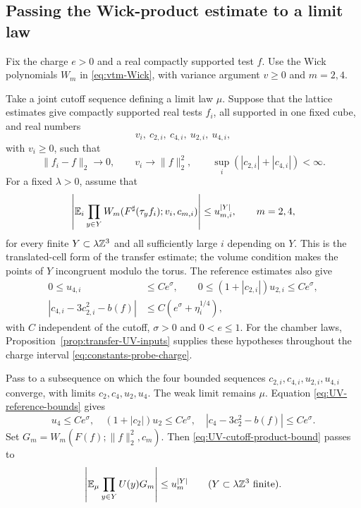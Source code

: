 \subsection{Passing the Wick-product estimate to a limit law}

Fix the charge $e>0$ and a real compactly supported test $f$.
Use the Wick polynomials $W_m$ in \eqref{eq:vtm-Wick},
with variance argument $v\ge0$ and $m=2,4$.

Take a joint cutoff sequence defining a limit law $\mu$.
Suppose that the lattice estimates give compactly
supported real tests $f_i$, all supported in one fixed cube,
and real numbers
\[
 v_i,\ c_{2,i},\ c_{4,i},\ u_{2,i},\ u_{4,i},
\]
with
$v_i\ge0$, such that
\begin{equation}\label{eq:UV-test-convergence}
 \|f_i-f\|_2\to0,\qquad
 v_i\to\|f\|_2^2,\qquad
 \sup_i(|c_{2,i}|+|c_{4,i}|)<\infty.
\end{equation}
For a fixed $\lambda>0$, assume that
\begin{equation}\label{eq:UV-cutoff-product-bound}
 \left|\mathbb E_i\prod_{y\in Y}
       W_m(F^\sharp(\tau_y f_i);v_i,c_{m,i})\right|
                     \le u_{m,i}^{|Y|},\qquad m=2,4,
\end{equation}
for every finite $Y\subset\lambda\mathbb Z^3$ and all sufficiently
large $i$ depending on $Y$. This is the translated-cell form
of the transfer estimate; the volume condition makes the
points of $Y$ incongruent modulo the torus.
The reference estimates also give
\begin{equation}\label{eq:UV-reference-bounds}
 \begin{split}
 0\le u_{4,i}&\le Ce^\sigma,\qquad
 0\le(1+|c_{2,i}|)u_{2,i}\le Ce^\sigma,\\
 |c_{4,i}-3c_{2,i}^2-b(f)|
                  &\le C(e^\sigma+\eta_i^{1/4}),
 \end{split}
\end{equation}
with $C$ independent of the cutoff, $\sigma>0$ and $0<e\le1$.
For the chamber laws, Proposition~\ref{prop:transfer-UV-inputs}
supplies these hypotheses throughout the charge interval
\eqref{eq:constants-probe-charge}.

Pass to a subsequence on which the four bounded sequences
$c_{2,i},c_{4,i},u_{2,i},u_{4,i}$ converge, with limits
$c_2,c_4,u_2,u_4$. The weak limit remains $\mu$.
Equation \eqref{eq:UV-reference-bounds} gives
\begin{equation}\label{eq:UV-reference-limit}
 u_4\le Ce^\sigma,\quad
 (1+|c_2|)u_2\le Ce^\sigma,\quad
 |c_4-3c_2^2-b(f)|\le Ce^\sigma.
\end{equation}
Set $G_m=W_m(F(f);\|f\|_2^2,c_m)$.
Then \eqref{eq:UV-cutoff-product-bound} passes to
\begin{equation}\label{eq:UV-law-product-bound}
 \left|\mathbb E_\mu\prod_{y\in Y}U(y)G_m\right|\le u_m^{|Y|}
                   \qquad(Y\subset\lambda\mathbb Z^3\text{ finite}).
\end{equation}

